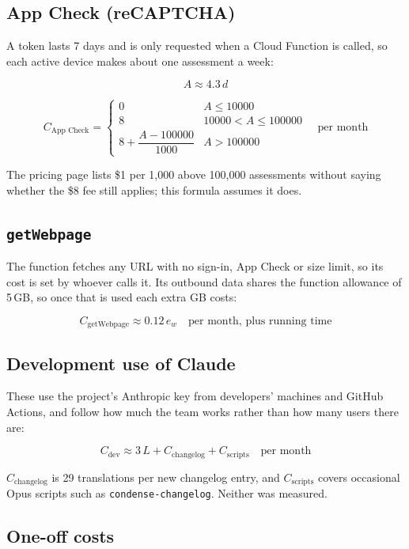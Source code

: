 \documentclass{article}
\begin{document}
\subsection{App Check (reCAPTCHA)}

A token lasts 7 days and is only requested when a Cloud Function is called,
so each active device makes about one assessment a week:

\[
A \approx 4.3\,d
\]

\[
C_{\text{App Check}} =
\begin{cases}
0 & A \le 10000 \\
8 & 10000 < A \le 100000 \\
8 + \dfrac{A - 100000}{1000} & A > 100000
\end{cases}
\quad \text{per month}
\]

The pricing page lists \$1 per 1{,}000 above 100{,}000 assessments without
saying whether the \$8 fee still applies; this formula assumes it does.

\subsection{\texttt{getWebpage}}

The function fetches any URL with no sign-in, App Check or size limit, so its
cost is set by whoever calls it. Its outbound data shares the function
allowance of 5\,GB, so once that is used each extra GB costs:

\[
C_{\text{getWebpage}} \approx 0.12\,e_w
\quad \text{per month, plus running time}
\]

\subsection{Development use of Claude}

These use the project's Anthropic key from developers' machines and GitHub
Actions, and follow how much the team works rather than how many users there
are:

\[
C_{\text{dev}} \approx 3\,L + C_{\text{changelog}} + C_{\text{scripts}}
\quad \text{per month}
\]

$C_{\text{changelog}}$ is 29 translations per new changelog entry, and
$C_{\text{scripts}}$ covers occasional Opus scripts such as
\texttt{condense-changelog}. Neither was measured.

\subsection{One-off costs}
\end{document}
